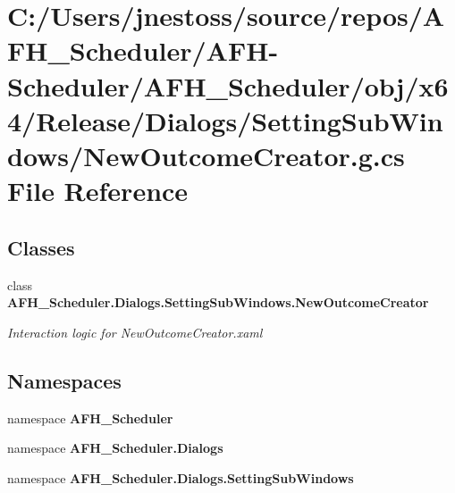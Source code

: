 \section{C\+:/\+Users/jnestoss/source/repos/\+A\+F\+H\+\_\+\+Scheduler/\+A\+F\+H-\/\+Scheduler/\+A\+F\+H\+\_\+\+Scheduler/obj/x64/\+Release/\+Dialogs/\+Setting\+Sub\+Windows/\+New\+Outcome\+Creator.g.\+cs File Reference}
\label{x64_2_release_2_dialogs_2_setting_sub_windows_2_new_outcome_creator_8g_8cs}
\subsection*{Classes}
\begin{DoxyCompactItemize}
\item 
class \textbf{ A\+F\+H\+\_\+\+Scheduler.\+Dialogs.\+Setting\+Sub\+Windows.\+New\+Outcome\+Creator}
\begin{DoxyCompactList}\small\item\em Interaction logic for New\+Outcome\+Creator.\+xaml \end{DoxyCompactList}\end{DoxyCompactItemize}
\subsection*{Namespaces}
\begin{DoxyCompactItemize}
\item 
namespace \textbf{ A\+F\+H\+\_\+\+Scheduler}
\item 
namespace \textbf{ A\+F\+H\+\_\+\+Scheduler.\+Dialogs}
\item 
namespace \textbf{ A\+F\+H\+\_\+\+Scheduler.\+Dialogs.\+Setting\+Sub\+Windows}
\end{DoxyCompactItemize}
